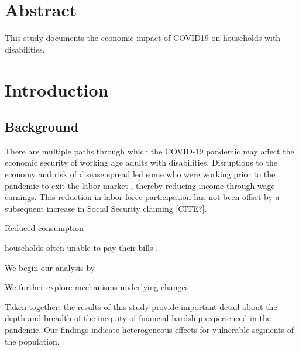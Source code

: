 \documentclass[12pt]{article}
\begin{document}
\cleardoublepage{}


\cleardoublepage{}

\linespread{1.25} 
\section*{Abstract}
This study documents the economic impact of COVID19 on households with disabilities.

\newpage 
 
\section{Introduction}

\subsection{Background}

 
 
 
There are multiple paths through which the COVID-19 pandemic may affect the economic security of working age adults with disabilities. Disruptions to the economy and risk of disease spread led some who were working prior to the pandemic to exit the labor market \citep{cheng2020back, goda2021impact moen2020disparate, quinby2021older }, thereby reducing income through wage earnings. This reduction in labor force participation has not been offset by a subsequent increase in Social Security  claiming [CITE?].   


Reduced consumption \citep{baker2020does,horvath2021covid} 

households often unable to pay their bills \citep{clark2021financial,schneider2020household}. 

  
We begin our analysis by  

We further explore mechanisms underlying changes 

 

Taken together, the results of this study provide important detail about the depth and breadth of the inequity of financial hardship experienced in the pandemic. Our findings indicate heterogeneous effects for vulnerable segments of the population.    


\cite{adams2020inequality,andersen2020consumer,andersen2020pandemic,baker2020does,bhutta2020covid,braxton2020can,brewer2020initial,casado2020aggregate,cheng2020back,cherry2021government,chetty2020did,clark2021financial,coibion2020labor,cfpb2020,cowan2020short,cutts2020musings,emerson2021impact,enriquez2020covid,farrell2020consumption,findling2021serious,gerardi2021racial,gignac2021impacts,goda2022impact,goda2021impact,grantz2020use,haughwout2020us,horvath2021covid,li2020impact,loibl2020role,lusardi20186,moen2020disparate,mullen2022economic,quinby2021older,schneider2020household,schur2021covid,stavins2021unprepared}
\end{document}
